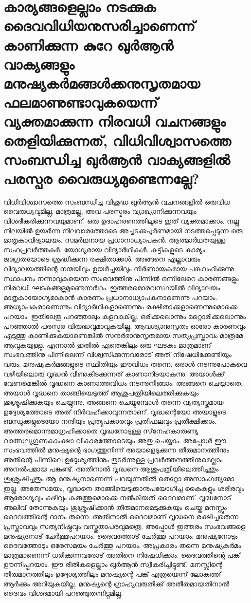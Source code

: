 \section{  കാര്യങ്ങളെല്ലാം നടക്കുക ദൈവവിധിയനുസരിച്ചാണെന്ന് കാണിക്കുന്ന കുറേ ഖുര്‍ആന്‍ വാക്യങ്ങളും മനുഷ്യകര്‍മങ്ങള്‍ക്കനുസൃതമായ ഫലമാണുണ്ടാവുകയെന്ന് വ്യക്തമാക്കുന്ന നിരവധി വചനങ്ങളും തെളിയിക്കുന്നത്, വിധിവിശ്വാസത്തെ സംബന്ധിച്ച ഖുര്‍ആന്‍ വാക്യങ്ങളില്‍ പരസ്പര വൈരുധ്യമുണ്ടെന്നല്ലേ?}
 വിധിവിശ്വാസത്തെ സംബന്ധിച്ച വിശുദ്ധ ഖുര്‍ആന്‍ വചനങ്ങളില്‍ ഒരുവിധ വൈരുധ്യവുമില്ല. മാത്രമല്ല, അവ പരസ്പരം വ്യാഖ്യാനിക്കുന്നവയും വിശദീകരിക്കുന്നവയുമാണ്. ഒരു ഉദാഹരണത്തിലൂടെ ഇത് വ്യക്തമാക്കാം.
നല്ല നിലയില്‍ ഉയര്‍ന്ന നിലവാരത്തോടെ അച്ചടക്കപൂര്‍ണമായി നടത്തപ്പെടുന്ന ഒരു മാതൃകാവിദ്യാലയം. സമര്‍ഥനായ പ്രധാനാധ്യാപകന്‍. ആത്മാര്‍ഥതയുള്ള സഹപ്രവര്‍ത്തകര്‍. യോഗ്യരായ വിദ്യാര്‍ഥികള്‍. കുട്ടികളുടെ കാര്യം ജാഗ്രതയോടെ ശ്രദ്ധിക്കുന്ന രക്ഷിതാക്കള്‍. അങ്ങനെ എല്ലാവരും വിദ്യാലയത്തിന്റെ നന്മയിലും ഉയര്‍ച്ചയിലും നിര്‍ണായകമായ പങ്കുവഹിക്കുന്നു. സ്ഥാപനം നന്നാവുകയെന്ന സംഭവത്തിനു പിന്നില്‍ ഒന്നിലേറെ കാരണങ്ങളും നിരവധി ഘടകങ്ങളുമുണ്ടെന്നര്‍ഥം. ഇത്തരമൊരവസ്ഥയില്‍ വിദ്യാലയം മാതൃകായോഗ്യമാകാന്‍ കാരണം പ്രധാനാധ്യാപകനാണെന്നു പറയാം. അധ്യാപകരാണെന്നും വിദ്യാര്‍ഥികളാണെന്നും രക്ഷിതാക്കളാണെന്നുമൊക്കെ പറയാം. ഇതിലേതു പറഞ്ഞാലും കളവാകില്ല. ഒരിക്കലൊന്നും മറ്റൊരിക്കലൊന്നും പറഞ്ഞാല്‍ പരസ്പര വിരുദ്ധവുമാവുകയില്ല. ആവശ്യാനുസൃതം ഓരോ കാരണവും എടുത്തു കാണിക്കുകയാണെങ്കില്‍ സന്ദര്‍ഭാനുസൃതമായ സത്യപ്രസ്താവം മാത്രമേ ആവുകയുള്ളൂ. എന്നാല്‍ ഇതില്‍ ഏതെങ്കിലും ഒരു ഘടകം മാത്രമാണ് സംഭവത്തിനു പിന്നിലെന്ന് വിശ്വസിക്കുന്നവരോട് അത് നിഷേധിക്കേണ്ടിയും വരും.
മനുഷ്യകര്‍മങ്ങളുടെ സ്ഥിതിയും ഈവിധം തന്നെ. ഒരാള്‍ നടന്നുപോകവെ വഴിയിലൊരു വൃദ്ധന്‍ വീണുകിടക്കുന്നത് കാണാനിടയാകുന്നു. അയാള്‍ക്ക് വേണമെങ്കില്‍ വൃദ്ധനെ കാണാത്തവിധം നടന്നുനീങ്ങാം. അങ്ങനെ ചെയ്യാതെ, അയാള്‍ വൃദ്ധനെ താങ്ങിയെടുത്ത് ആശുപത്രിയിലെത്തിക്കുകയും ശുശ്രൂഷിക്കുകയും ചെയ്യുന്നു. അങ്ങനെ ചെയ്യുമ്പോള്‍ തന്നെ വ്യത്യസ്തമായ ഉദ്ദേശ്യത്തോടെ അത് നിര്‍വഹിക്കാവുന്നതാണ്. വൃദ്ധന്റെയോ അയാളുടെ ബന്ധുക്കളുടെയോ നന്ദിയും പ്രത്യുപകാരവും പ്രതിഫലവും പ്രതീക്ഷിക്കാം. അത്തരമൊന്നുമാഗ്രഹിക്കാതെ വൃദ്ധനോടുള്ള സ്‌നേഹകാരുണ്യ വാത്സല്യഗുണകാംക്ഷാ വികാരത്തോടെയും അതു ചെയ്യാം. അപ്പോള്‍ ഈ സംഭവത്തില്‍ മനുഷ്യന്റെ ഭാഗത്തുനിന്ന് അയാളെടുക്കുന്ന തീരുമാനത്തിനും അതിന്റെ പിന്നിലെ ഉദ്ദേശ്യത്തിനും തുടര്‍ന്നുള്ള പ്രവര്‍ത്തനത്തിനുമെല്ലാം അനല്‍പമായ പങ്കുണ്ട്. അതിനാല്‍ വൃദ്ധനെ ആശുപത്രിയിലെത്തിച്ചതും ശുശ്രൂഷിച്ചതും ആ മനുഷ്യനാണെന്ന് പറയുന്നതില്‍ തെറ്റോ അസാംഗത്യമോ ഇല്ല. അതേസമയം, വൃദ്ധനെ താങ്ങിയെടുക്കാനുപയോഗിച്ച കൈകളും ശരീരവും ആരോഗ്യവും കഴിവും കരുത്തുമൊക്കെ നല്‍കിയത് ദൈവമാണ്. വൃദ്ധനോട് അലിവ് തോന്നുകയും ശുശ്രൂഷിക്കാന്‍ തീരുമാനമെടുക്കുകയും ചെയ്ത മനസ്സും ദൈവത്തിന്റെ ദാനം തന്നെ. അതിനാല്‍ ദൈവമാണ് വൃദ്ധനെ രക്ഷിച്ചതെന്ന പ്രസ്താവവും സത്യനിഷ്ഠവും വസ്തുതാപരവുമത്രെ. അപ്പോള്‍ ഇത്തരം സംഭവങ്ങളെ മനുഷ്യനോട് ചേര്‍ത്തുപറയാം, ദൈവത്തോട് ചേര്‍ത്തു പറയാം; മനുഷ്യനോടും ദൈവത്തോടും ഒരേസമയം ചേര്‍ത്തു പറയാം. അപ്രകാരം തന്നെ മനുഷ്യകര്‍മം മാത്രമാണെന്ന് ധരിക്കുന്നവരോട് അതിനെ നിഷേധിക്കാം. ദൈവത്തിന്റെ പങ്ക് ഊന്നിപ്പറയാം. ഈ രീതികളെല്ലാം ഖുര്‍ആന്‍ സ്വീകരിച്ചിട്ടുണ്ട്. മനസ്സിന്റെ തീരുമാനത്തിലും ഉദ്ദേശ്യത്തിലും മനുഷ്യന്റെ പങ്ക് എത്രയെന്ന് ലോകത്ത് ആര്‍ക്കും അറിയുകയില്ല. മനുഷ്യന്റെ ഗ്രാഹ്യവരുതിക്ക് അതീതമായതിനാല്‍ ദൈവം വിശദമായി പറഞ്ഞുതന്നിട്ടുമില്ല.
